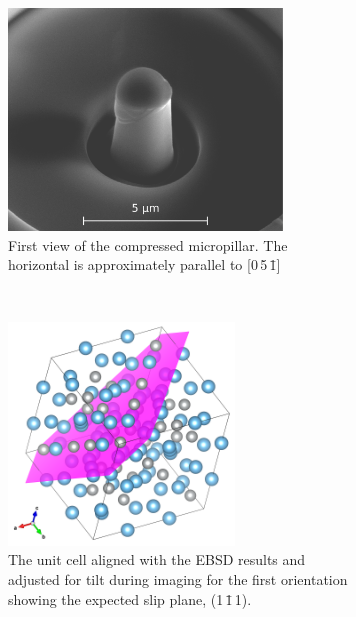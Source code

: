 \begin{figure}
\centering
\begin{subfigure}{0.45\textwidth}
\centering
\includegraphics[width=0.8\textwidth]{pillar_3_v1}
\caption{First view of the compressed  micropillar. The horizontal is approximately parallel to [0\,5\,\={1}]}
\end{subfigure}
~
\begin{subfigure}{0.45\textwidth}
\centering
\includegraphics[width=0.66\textwidth]{Pillar_3_unit_cell_v1}
\caption{The unit cell aligned with the EBSD results and adjusted for tilt during imaging for the first orientation showing the expected slip plane, (1\,\={1}\,1).}
\end{subfigure}
\par\bigskip
\begin{subfigure}{0.45\textwidth}
\centering

\end{subfigure}
\end{figure}
